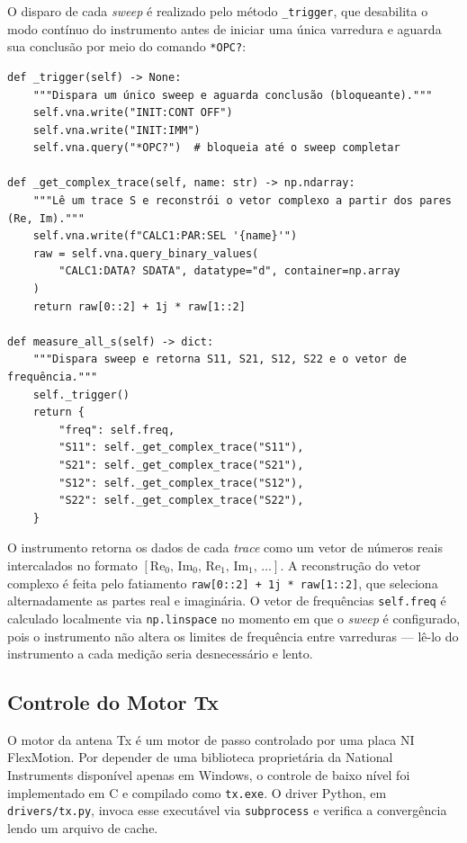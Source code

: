 \documentclass[12pt, a4paper]{article}
\begin{document}
O disparo de cada \textit{sweep} é realizado pelo método \texttt{\_trigger}, que desabilita o modo contínuo do instrumento antes de iniciar uma única varredura e aguarda sua conclusão por meio do comando \texttt{*OPC?}:

\begin{lstlisting}[style=python, caption={Disparo de um único \textit{sweep} e leitura de um \textit{trace} S (\texttt{drivers/vna.py}).}]
def _trigger(self) -> None:
    """Dispara um único sweep e aguarda conclusão (bloqueante)."""
    self.vna.write("INIT:CONT OFF")
    self.vna.write("INIT:IMM")
    self.vna.query("*OPC?")  # bloqueia até o sweep completar

def _get_complex_trace(self, name: str) -> np.ndarray:
    """Lê um trace S e reconstrói o vetor complexo a partir dos pares (Re, Im)."""
    self.vna.write(f"CALC1:PAR:SEL '{name}'")
    raw = self.vna.query_binary_values(
        "CALC1:DATA? SDATA", datatype="d", container=np.array
    )
    return raw[0::2] + 1j * raw[1::2]

def measure_all_s(self) -> dict:
    """Dispara sweep e retorna S11, S21, S12, S22 e o vetor de frequência."""
    self._trigger()
    return {
        "freq": self.freq,
        "S11": self._get_complex_trace("S11"),
        "S21": self._get_complex_trace("S21"),
        "S12": self._get_complex_trace("S12"),
        "S22": self._get_complex_trace("S22"),
    }
\end{lstlisting}

O instrumento retorna os dados de cada \textit{trace} como um vetor de números reais intercalados no formato $[\mathrm{Re}_0,\, \mathrm{Im}_0,\, \mathrm{Re}_1,\, \mathrm{Im}_1,\, \ldots]$. A reconstrução do vetor complexo é feita pelo fatiamento \texttt{raw[0::2] + 1j * raw[1::2]}, que seleciona alternadamente as partes real e imaginária. O vetor de frequências \texttt{self.freq} é calculado localmente via \texttt{np.linspace} no momento em que o \textit{sweep} é configurado, pois o instrumento não altera os limites de frequência entre varreduras --- lê-lo do instrumento a cada medição seria desnecessário e lento.

\subsection{Controle do Motor Tx}

O motor da antena Tx é um motor de passo controlado por uma placa NI FlexMotion. Por depender de uma biblioteca proprietária da National Instruments disponível apenas em Windows, o controle de baixo nível foi implementado em C e compilado como \texttt{tx.exe}. O driver Python, em \texttt{drivers/tx.py}, invoca esse executável via \texttt{subprocess} e verifica a convergência lendo um arquivo de cache.
\end{document}
